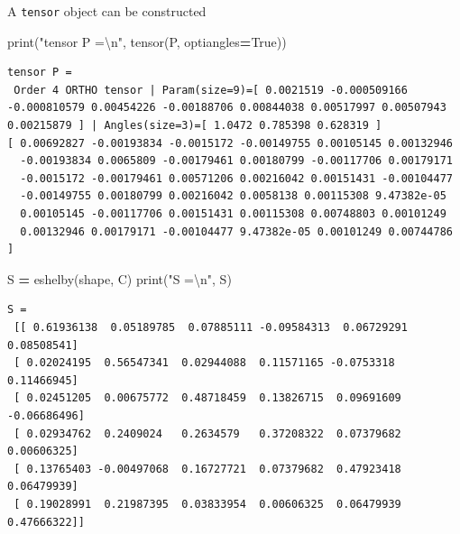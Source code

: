 \documentclass[
  a4paper,
  numbers=noendperiod,
  DIV=12]{scrreprt}
\newenvironment{Shaded}{\begin{snugshade}}{\end{snugshade}}
\newcommand{\BuiltInTok}[1]{#1}
\newcommand{\CharTok}[1]{\textcolor[rgb]{0.31,0.60,0.02}{#1}}
\newcommand{\NormalTok}[1]{#1}
\newcommand{\OperatorTok}[1]{\textcolor[rgb]{0.81,0.36,0.00}{\textbf{#1}}}
\newcommand{\StringTok}[1]{\textcolor[rgb]{0.31,0.60,0.02}{#1}}
\newcommand{\VariableTok}[1]{\textcolor[rgb]{0.00,0.00,0.00}{#1}}
\begin{document}
A \texttt{tensor} object can be constructed

\begin{Shaded}
\begin{Highlighting}[]
\BuiltInTok{print}\NormalTok{(}\StringTok{"tensor P =}\CharTok{\textbackslash{}n}\StringTok{"}\NormalTok{, tensor(P, optiangles}\OperatorTok{=}\VariableTok{True}\NormalTok{))}
\end{Highlighting}
\end{Shaded}

\begin{verbatim}
tensor P =
 Order 4 ORTHO tensor | Param(size=9)=[ 0.0021519 -0.000509166 -0.000810579 0.00454226 -0.00188706 0.00844038 0.00517997 0.00507943 0.00215879 ] | Angles(size=3)=[ 1.0472 0.785398 0.628319 ]
[ 0.00692827 -0.00193834 -0.0015172 -0.00149755 0.00105145 0.00132946 
  -0.00193834 0.0065809 -0.00179461 0.00180799 -0.00117706 0.00179171 
  -0.0015172 -0.00179461 0.00571206 0.00216042 0.00151431 -0.00104477 
  -0.00149755 0.00180799 0.00216042 0.0058138 0.00115308 9.47382e-05 
  0.00105145 -0.00117706 0.00151431 0.00115308 0.00748803 0.00101249 
  0.00132946 0.00179171 -0.00104477 9.47382e-05 0.00101249 0.00744786 ]
\end{verbatim}

\begin{Shaded}
\begin{Highlighting}[]
\NormalTok{S }\OperatorTok{=}\NormalTok{ eshelby(shape, C)}
\BuiltInTok{print}\NormalTok{(}\StringTok{"S =}\CharTok{\textbackslash{}n}\StringTok{"}\NormalTok{, S)}
\end{Highlighting}
\end{Shaded}

\begin{verbatim}
S =
 [[ 0.61936138  0.05189785  0.07885111 -0.09584313  0.06729291  0.08508541]
 [ 0.02024195  0.56547341  0.02944088  0.11571165 -0.0753318   0.11466945]
 [ 0.02451205  0.00675772  0.48718459  0.13826715  0.09691609 -0.06686496]
 [ 0.02934762  0.2409024   0.2634579   0.37208322  0.07379682  0.00606325]
 [ 0.13765403 -0.00497068  0.16727721  0.07379682  0.47923418  0.06479939]
 [ 0.19028991  0.21987395  0.03833954  0.00606325  0.06479939  0.47666322]]
\end{verbatim}
\end{document}
